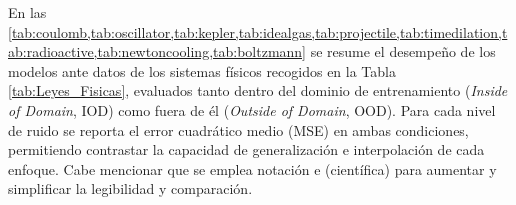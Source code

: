 \documentclass[11pt, a4paper]{article}
\begin{document}
En las \cref{tab:coulomb,tab:oscillator,tab:kepler,tab:idealgas,tab:projectile,tab:timedilation,tab:radioactive,tab:newtoncooling,tab:boltzmann} se resume el desempeño de los modelos ante datos de los sistemas físicos recogidos en la Tabla \ref{tab:Leyes_Fisicas}, evaluados tanto dentro del dominio de entrenamiento (\textit{Inside of Domain}, IOD) como fuera de él (\textit{Outside of Domain}, OOD). Para cada nivel de ruido se reporta el error cuadrático medio (MSE) en ambas condiciones, permitiendo contrastar la capacidad de generalización e interpolación de cada enfoque. Cabe mencionar que se emplea notación e (científica) para aumentar y simplificar la legibilidad y comparación.



\FloatBarrier  
\begin{table}[H]
\centering
\footnotesize
\setlength{\tabcolsep}{0pt}
\caption{Resultados para la \textbf{Ley de Coulomb} ($F = q_1 q_2 / r^2$).}
\label{tab:coulomb}
\end{table}
\end{document}
